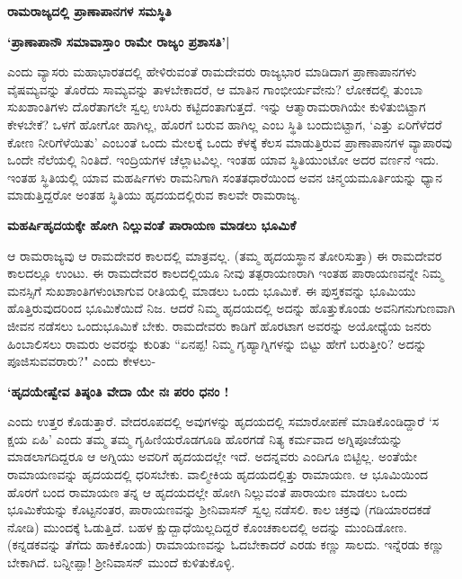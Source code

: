 {\bf ರಾಮರಾಜ್ಯದಲ್ಲಿ ಪ್ರಾಣಾಪಾನಗಳ ಸಮಸ್ಥಿತಿ} 


\begin{center} 

{\bf `ಪ್ರಾಣಾಪಾನೌ ಸಮಾವಾಸ್ತಾಂ ರಾಮೇ ರಾಜ್ಯಂ ಪ್ರಶಾಸತಿ'|} 

\end{center} 


ಎಂದು ವ್ಯಾಸರು ಮಹಾಭಾರತದಲ್ಲಿ ಹೇಳಿರುವಂತೆ ರಾಮದೇವರು ರಾಜ್ಯಭಾರ ಮಾಡಿದಾಗ ಪ್ರಾಣಾಪಾನಗಳು ವೈಷಮ್ಯವನ್ನು ತೊರೆದು ಸಾಮ್ಯವನ್ನು ತಾಳಬೇಕಾದರೆ, ಆ ಮಾತಿನ ಗಾಂಭೀರ್ಯವೇನು? ಲೋಕದಲ್ಲಿ ತುಂಬಾ ಸುಖಶಾಂತಿಗಳು ದೊರೆತಾಗಲೇ ಸ್ವಲ್ಪ ಉಸಿರು ಕಟ್ಟಿದಂತಾಗುತ್ತದೆ. ಇನ್ನು ಆತ್ಮಾರಾಮರಾಗಿಯೇ ಕುಳಿತುಬಿಟ್ಟಾಗ ಕೇಳಬೇಕೆ? ಒಳಗೆ ಹೋಗೋ ಹಾಗಿಲ್ಲ, ಹೊರಗೆ ಬರುವ ಹಾಗಿಲ್ಲ ಎಂಬ ಸ್ಥಿತಿ ಬಂದುಬಿಟ್ಟಾಗ, `ಎತ್ತು ಏರಿಗೆಳೆದರೆ ಕೋಣ ನೀರಿಗೆಳೆಯಿತು' ಎಂಬಂತೆ ಒಂದು ಮೇಲಕ್ಕೆ ಒಂದು ಕೆಳಕ್ಕೆ ಕೆಲಸ ಮಾಡುತ್ತಿರುವ ಪ್ರಾಣಾಪಾನಗಳ ವ್ಯಾಪಾರವು ಒಂದೇ ನೆಲೆಯಲ್ಲಿ ನಿಂತಿದೆ. ಇಂದ್ರಿಯಗಳ ಚೆಲ್ಲಾಟವಿಲ್ಲ. ಇಂತಹ ಯಾವ ಸ್ಥಿತಿಯುಂಟೋ ಅದರ ವರ್ಣನೆ ಇದು. ಇಂತಹ ಸ್ಥಿತಿಯಲ್ಲಿ ಯಾವ ಮಹರ್ಷಿಗಳು ರಾಮನಿಗಾಗಿ ಸಂತತಧಾರೆಯಿಂದ ಅವನ ಚಿನ್ಮಯಮೂರ್ತಿಯನ್ನು ಧ್ಯಾನ ಮಾಡುತ್ತಿದ್ದರೋ ಅಂತಹ ಸ್ಥಿತಿಯು ಹೃದಯದಲ್ಲಿರುವ ಕಾಲವೇ ರಾಮರಾಜ್ಯ. 


{\bf ಮಹರ್ಷಿಹೃದಯಕ್ಕೇ ಹೋಗಿ ನಿಲ್ಲುವಂತೆ ಪಾರಾಯಣ ಮಾಡಲು ಭೂಮಿಕೆ} 


ಆ ರಾಮರಾಜ್ಯವು ಆ ರಾಮದೇವರ ಕಾಲದಲ್ಲಿ ಮಾತ್ರವಲ್ಲ. (ತಮ್ಮ ಹೃದಯಸ್ಥಾನ ತೋರಿಸುತ್ತಾ) ಈ ರಾಮದೇವರ ಕಾಲದಲ್ಲೂ ಉಂಟು. ಈ ರಾಮದೇವರ ಕಾಲದಲ್ಲಿಯೂ ನೀವು ತತ್ಪರಾಯಣರಾಗಿ ಇಂತಹ ಪಾರಾಯಣವನ್ನೇ ನಿಮ್ಮ ಮನಸ್ಸಿಗೆ ಸುಖಶಾಂತಿಗಳುಂಟಾಗುವ ರೀತಿಯಲ್ಲಿ ಮಾಡಲು ಒಂದು ಭೂಮಿಕೆ. ಈ ಪುಸ್ತಕವನ್ನು ಭೂಮಿಯು ಹೊತ್ತಿರುವುದರಿಂದ ಭೂಮಿಕೆಯಿದೆ ನಿಜ. ಆದರೆ ನಿಮ್ಮ ಹೃದಯದಲ್ಲಿ ಅದನ್ನು ಹೊತ್ತುಕೊಂಡು ಅವನಿಗನುಗುಣವಾಗಿ ಜೀವನ ನಡೆಸಲು ಒಂದುಭೂಮಿಕೆ ಬೇಕು. ರಾಮದೇವರು ಕಾಡಿಗೆ ಹೊರಟಾಗ ಅವರನ್ನು ಅಯೋಧ್ಯೆಯ ಜನರು ಹಿಂಬಾಲಿಸಲು ರಾಮರು ಅವರನ್ನು ಕುರಿತು ``ಏನಪ್ಪ! ನಿಮ್ಮ ಗೃಹ್ಯಾಗ್ನಿಗಳನ್ನು ಬಿಟ್ಟು ಹೇಗೆ ಬರುತ್ತೀರಿ? ಅದನ್ನು ಪೂಜಿಸುವವರಾರು?" ಎಂದು ಕೇಳಲು- 


\begin{center} 

{\bf `ಹೃದಯೇಷ್ವೇವ ತಿಷ್ಠಂತಿ ವೇದಾ ಯೇ ನಃ ಪರಂ ಧನಂ !} 

\end{center} 


ಎಂದು ಉತ್ತರ ಕೊಡುತ್ತಾರೆ. ವೇದರೂಪದಲ್ಲಿ ಅವುಗಳನ್ನು ಹೃದಯದಲ್ಲಿ ಸಮಾರೋಪಣೆ ಮಾಡಿಕೊಂಡಿದ್ದಾರೆ `ಸ ಕ್ಷಯ ಏಹಿ' ಎಂದು ತಮ್ಮ ತಮ್ಮ ಗೃಹಿಣಿಯರೊಡಗೂಡಿ ಹೊರಗಡೆ ನಿತ್ಯ ಕರ್ಮವಾದ ಅಗ್ನಿಪೂಜೆಯನ್ನು ಮಾಡಲಾಗದಿದ್ದರೂ ಆ ಅಗ್ನಿಯು ಅವರಿಗೆ ಹೃದಯದಲ್ಲೇ ಇದೆ. ಅದನ್ನವರು ಎಂದಿಗೂ ಬಿಟ್ಟಿಲ್ಲ. ಅಂತೆಯೇ ರಾಮಾಯಣವನ್ನು ಹೃದಯದಲ್ಲಿ ಧರಿಸಬೇಕು. ವಾಲ್ಮೀಕಿಯ ಹೃದಯದಲ್ಲಿತ್ತು ರಾಮಾಯಣ. ಆ ಭೂಮಿಯಿಂದ ಹೊರಗೆ ಬಂದ ರಾಮಾಯಣ ತನ್ನ ಆ ಹೃದಯದಲ್ಲೇ ಹೋಗಿ ನಿಲ್ಲುವಂತೆ ಪಾರಾಯಣ ಮಾಡಲು ಒಂದು ಭೂಮಿಕೆಯನ್ನು ಕೊಟ್ಟನಂತರ, ಪಾರಾಯಣವನ್ನು ಶ್ರೀನಿವಾಸನ್‍ ಸ್ವಲ್ಪ ನಡೆಸಲಿ. ಕಾಲ ಚಕ್ರವು (ಗಡಿಯಾರದಕಡೆ ನೋಡಿ) ಮುಂದಕ್ಕೆ ಓಡುತ್ತಿದೆ. ಬಹಳ ಕ್ಷುದ್ಬಾಧೆಯಿಲ್ಲದಿದ್ದರೆ ಕೊಂಚಕಾಲದಲ್ಲಿ ಅದನ್ನು ಮುಂದಿಡೋಣ. (ಕನ್ನಡಕವನ್ನು ತೆಗೆದು ಹಾಕಿಕೊಂಡು) ರಾಮಾಯಣವನ್ನು ಓದಬೇಕಾದರೆ ಎರಡು ಕಣ್ಣು ಸಾಲದು. ಇನ್ನೆರಡು ಕಣ್ಣು ಬೇಕಾಗಿದೆ. ಬನ್ನೀಪ್ಪಾ! ಶ್ರೀನಿವಾಸನ್‍ ಮುಂದೆ ಕುಳಿತುಕೊಳ್ಳಿ. 


